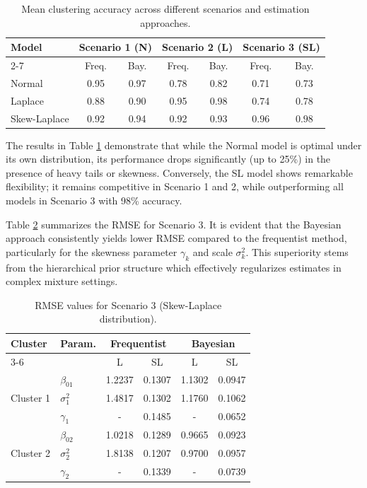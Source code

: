 \documentclass[twoside]{article}
\begin{document}
\begin{table}[ht]
\centering
\caption{Mean clustering accuracy across different scenarios and estimation approaches.}
\label{tab:accuracy}
\small
\begin{tabular}{lcccccc}
\hline
\multirow{2}{*}{Model} & \multicolumn{2}{c}{Scenario 1 (N)} & \multicolumn{2}{c}{Scenario 2 (L)} & \multicolumn{2}{c}{Scenario 3 (SL)} \\
\cline{2-7}
 & Freq. & Bay. & Freq. & Bay. & Freq. & Bay. \\
\hline
Normal & 0.95 & 0.97 & 0.78 & 0.82 & 0.71 & 0.73 \\
Laplace & 0.88 & 0.90 & 0.95 & 0.98 & 0.74 & 0.78 \\
Skew-Laplace & 0.92 & 0.94 & 0.92 & 0.93 & $\mathbf{0.96}$ & $\mathbf{0.98}$ \\
\hline
\end{tabular}
\end{table}

The results in Table \ref{tab:accuracy} demonstrate that while the Normal model is optimal under its own distribution, its performance drops significantly (up to 25\%) in the presence of heavy tails or skewness. Conversely, the SL model shows remarkable flexibility; it remains competitive in Scenario 1 and 2, while outperforming all models in Scenario 3 with 98\% accuracy. 

Table \ref{tab:results_s3} summarizes the RMSE for Scenario 3. It is evident that the Bayesian approach consistently yields lower RMSE compared to the frequentist method, particularly for the skewness parameter $\gamma_k$ and scale $\sigma_k^2$. This superiority stems from the hierarchical prior structure which effectively regularizes estimates in complex mixture settings.

\begin{table}[ht]
\centering
\caption{RMSE values for Scenario 3 (Skew-Laplace distribution).}
\label{tab:results_s3}
\footnotesize
\begin{tabular}{llcccc}
\hline
\multirow{2}{*}{Cluster} & \multirow{2}{*}{Param.} & \multicolumn{2}{c}{Frequentist} & \multicolumn{2}{c}{Bayesian} \\
\cline{3-6}
 &  & L & SL & L & SL \\
\hline
\multirow{3}{*}{Cluster 1} & $\beta_{01}$ & 1.2237 & 0.1307 & 1.1302 & 0.0947 \\
 & $\sigma_1^2$ & 1.4817 & 0.1302 & 1.1760 & 0.1062 \\
 & $\gamma_1$ & - & 0.1485 & - & 0.0652 \\
\hline
\multirow{3}{*}{Cluster 2} & $\beta_{02}$ & 1.0218 & 0.1289 & 0.9665 & 0.0923 \\
 & $\sigma_2^2$ & 1.8138 & 0.1207 & 0.9700 & 0.0957 \\
 & $\gamma_2$ & - & 0.1339 & - & 0.0739 \\
\hline
\end{tabular}
\end{table}
\end{document}
